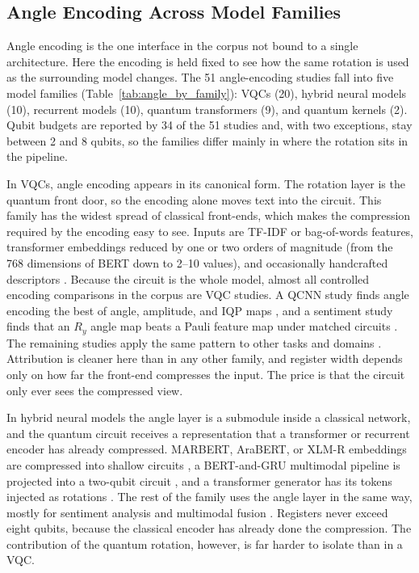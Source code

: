 \documentclass{ieeeaccess}
\begin{document}
\subsection{Angle Encoding Across Model Families}
\label{subsec:angle_across_families}

Angle encoding is the one interface in the corpus not bound to a single architecture. Here the encoding is held fixed to see how the same rotation is used as the surrounding model changes. The 51 angle-encoding studies fall into five model families (Table~\ref{tab:angle_by_family}): VQCs (20), hybrid neural models (10), recurrent models (10), quantum transformers (9), and quantum kernels (2). Qubit budgets are reported by 34 of the 51 studies and, with two exceptions, stay between 2 and 8 qubits, so the families differ mainly in where the rotation sits in the pipeline.

In VQCs, angle encoding appears in its canonical form. The rotation layer is the quantum front door, so the encoding alone moves text into the circuit.
This family has the widest spread of classical front-ends, which makes the compression required by the encoding easy to see. Inputs are TF-IDF or bag-of-words features, transformer embeddings reduced by one or two orders of magnitude (from the 768 dimensions of BERT down to 2–10 values), and occasionally handcrafted descriptors \cite{thota_comparison_2025,ahmad_hybrid_2023,kumar_hybrid_2026,altintas_beyond_2025,mompelat_compact_2026}. Because the circuit is the whole model, almost all controlled encoding comparisons in the corpus are VQC studies. A QCNN study finds angle encoding the best of angle, amplitude, and IQP maps \cite{ouamane_sentiment_2025}, and a sentiment study finds that an $R_y$ angle map beats a Pauli feature map under matched circuits \cite{ruskanda_evaluating_2025}. The remaining studies apply the same pattern to other tasks and domains \cite{ardeshir-larijani_hybrid_2024,hazim_hqml-nlp_2026,karanath_quantum-enhanced_2025,li_pqlm_2023,neto_quantum_2024,chen_multi-scale_2025,hussain_quantum_2025-1,yan_exploring_2026}.
Attribution is cleaner here than in any other family, and register width depends only on how far the front-end compresses the input. The price is that the circuit only ever sees the compressed view.

In hybrid neural models the angle layer is a submodule inside a classical network, and the quantum circuit receives a representation that a transformer or recurrent encoder has already compressed.
MARBERT, AraBERT, or XLM-R embeddings are compressed into shallow circuits \cite{suleiman_hdqe_2026}, a BERT-and-GRU multimodal pipeline is projected into a two-qubit circuit \cite{li_qmlsc_2025}, and a transformer generator has its tokens injected as rotations \cite{routh_hybrid_2025}. The rest of the family uses the angle layer in the same way, mostly for sentiment analysis and multimodal fusion \cite{dave_sentiqnf_2026,li_qd-msa_2025,roshan_ahmed_deepket-_2024,stenzel_qmamba_2025,yao_self-supervised_2025}.
Registers never exceed eight qubits, because the classical encoder has already done the compression. The contribution of the quantum rotation, however, is far harder to isolate than in a VQC.
\end{document}
